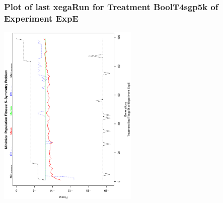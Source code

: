  \begin{frame}
 \frametitle{ Plot of last xegaRun for Treatment BoolT4sgp5k of Experiment ExpE }
 \begin{center}
\includegraphics[width=0.5\textwidth, angle=-90]
{ExpEPlotPopStatsFigure003.eps}
 \end{center}
 \label{report/ExpEPlotPopStatsFigure003.eps}  
 \end{frame}

